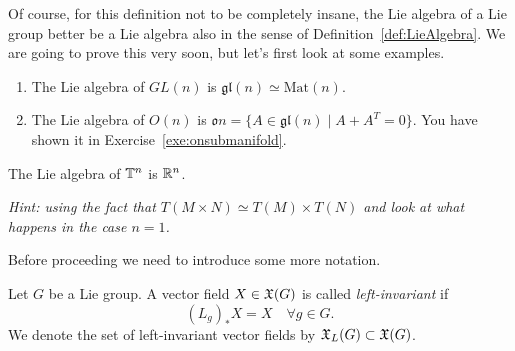 Of course, for this definition not to be completely insane, the Lie algebra of a Lie group better be a Lie algebra also in the sense of Definition~\ref{def:LieAlgebra}.
We are going to prove this very soon, but let's first look at some examples.

\begin{example}
  \begin{enumerate}
    \item The Lie algebra of $GL(n)$ is $\mathfrak{gl}(n)\simeq \mathrm{Mat}(n)$.
    \item The Lie algebra of $O(n)$ is $\mathfrak{o}{n} = \{A \in \mathfrak{gl}(n) \mid A+A^T = 0\}$. You have shown it in Exercise~\ref{exe:onsubmanifold}.
  \end{enumerate}
\end{example}

\begin{exercise}
  The Lie algebra of $\mathbb{T}^n$ is $\mathbb{R}^n$.

  \textit{\small Hint: using the fact that $T(M\times N) \simeq T(M)\times T(N)$ and look at what happens in the case $n=1$.}
\end{exercise}

Before proceeding we need to introduce some more notation.

\begin{definition}
  Let $G$ be a Lie group.
  A vector field $X\in\mathfrak{X}(G)$ is called \emph{left-invariant} if
  \begin{equation}
    (L_g)_*X = X \quad \forall g\in G.
  \end{equation}
  We denote the set of left-invariant vector fields by $\mathfrak{X}_L(G)\subset \mathfrak{X}(G)$.
\end{definition}


